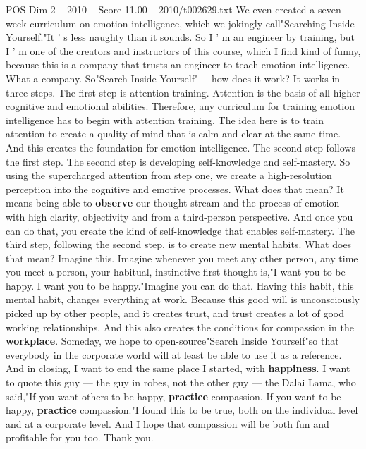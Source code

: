 \begin{textsample}{POS Dim 2 – 2010 – Score 11.00 – 2010/t002629.txt}
We even created a seven-week curriculum on emotion intelligence, which we jokingly call"Searching Inside Yourself."It ' s less naughty than it sounds.
So I ' m an engineer by training, but I ' m one of the creators and instructors of this course, which I find kind of funny, because this is a company that trusts an engineer to teach emotion intelligence.
What a company.
So"Search Inside Yourself"— how does it work?
It works in three steps.
The first step is attention training.
Attention is the basis of all higher cognitive and emotional abilities.
Therefore, any curriculum for training emotion intelligence has to begin with attention training.
The idea here is to train attention to create a quality of mind that is calm and clear at the same time.
And this creates the foundation for emotion intelligence.
The second step follows the first step.
The second step is developing self-knowledge and self-mastery.
So using the supercharged attention from step one, we create a high-resolution perception into the cognitive and emotive processes.
What does that mean?
It means being able to \textbf{observe} our thought stream and the process of emotion with high clarity, objectivity and from a third-person perspective.
And once you can do that, you create the kind of self-knowledge that enables self-mastery.
The third step, following the second step, is to create new mental habits.
What does that mean?
Imagine this.
Imagine whenever you meet any other person, any time you meet a person, your habitual, instinctive first thought is,"I want you to be happy.
I want you to be happy."Imagine you can do that.
Having this habit, this mental habit, changes everything at work.
Because this good will is unconsciously picked up by other people, and it creates trust, and trust creates a lot of good working relationships.
And this also creates the conditions for compassion in the \textbf{workplace}.
Someday, we hope to open-source"Search Inside Yourself"so that everybody in the corporate world will at least be able to use it as a reference.
And in closing, I want to end the same place I started, with \textbf{happiness}.
I want to quote this guy — the guy in robes, not the other guy — the Dalai Lama, who said,"If you want others to be happy, \textbf{practice} compassion.
If you want to be happy, \textbf{practice} compassion."I found this to be true, both on the individual level and at a corporate level.
And I hope that compassion will be both fun and profitable for you too.
Thank you.

\end{textsample}
